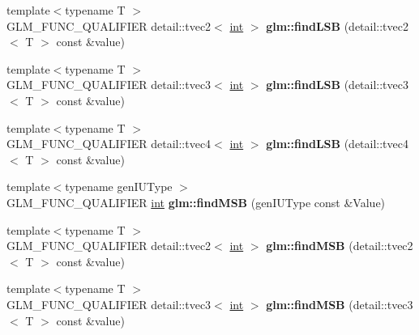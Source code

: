 \begin{DoxyCompactItemize}
\item 
\hypertarget{namespaceglm_ada2390329b6d8939a33c4c0483c1b51c}{}{\footnotesize template$<$typename T $>$ }\\G\+L\+M\+\_\+\+F\+U\+N\+C\+\_\+\+Q\+U\+A\+L\+I\+F\+I\+E\+R detail\+::tvec2$<$ \hyperlink{_s_d_l__thread_8h_a6a64f9be4433e4de6e2f2f548cf3c08e}{int} $>$ {\bfseries glm\+::find\+L\+S\+B} (detail\+::tvec2$<$ T $>$ const \&value)\label{namespaceglm_ada2390329b6d8939a33c4c0483c1b51c}

\item 
\hypertarget{namespaceglm_a9706c7ccb2061db6a078a742fb9ed7d0}{}{\footnotesize template$<$typename T $>$ }\\G\+L\+M\+\_\+\+F\+U\+N\+C\+\_\+\+Q\+U\+A\+L\+I\+F\+I\+E\+R detail\+::tvec3$<$ \hyperlink{_s_d_l__thread_8h_a6a64f9be4433e4de6e2f2f548cf3c08e}{int} $>$ {\bfseries glm\+::find\+L\+S\+B} (detail\+::tvec3$<$ T $>$ const \&value)\label{namespaceglm_a9706c7ccb2061db6a078a742fb9ed7d0}

\item 
\hypertarget{namespaceglm_affbe54a797335fd2dd46f5dbabb03f1e}{}{\footnotesize template$<$typename T $>$ }\\G\+L\+M\+\_\+\+F\+U\+N\+C\+\_\+\+Q\+U\+A\+L\+I\+F\+I\+E\+R detail\+::tvec4$<$ \hyperlink{_s_d_l__thread_8h_a6a64f9be4433e4de6e2f2f548cf3c08e}{int} $>$ {\bfseries glm\+::find\+L\+S\+B} (detail\+::tvec4$<$ T $>$ const \&value)\label{namespaceglm_affbe54a797335fd2dd46f5dbabb03f1e}

\item 
\hypertarget{namespaceglm_adc22c75c7dd35bacf86237d8bfe8b53a}{}{\footnotesize template$<$typename gen\+I\+U\+Type $>$ }\\G\+L\+M\+\_\+\+F\+U\+N\+C\+\_\+\+Q\+U\+A\+L\+I\+F\+I\+E\+R \hyperlink{_s_d_l__thread_8h_a6a64f9be4433e4de6e2f2f548cf3c08e}{int} {\bfseries glm\+::find\+M\+S\+B} (gen\+I\+U\+Type const \&Value)\label{namespaceglm_adc22c75c7dd35bacf86237d8bfe8b53a}

\item 
\hypertarget{namespaceglm_a242a34bcfa82ccbecb081091cfc5dcd3}{}{\footnotesize template$<$typename T $>$ }\\G\+L\+M\+\_\+\+F\+U\+N\+C\+\_\+\+Q\+U\+A\+L\+I\+F\+I\+E\+R detail\+::tvec2$<$ \hyperlink{_s_d_l__thread_8h_a6a64f9be4433e4de6e2f2f548cf3c08e}{int} $>$ {\bfseries glm\+::find\+M\+S\+B} (detail\+::tvec2$<$ T $>$ const \&value)\label{namespaceglm_a242a34bcfa82ccbecb081091cfc5dcd3}

\item 
\hypertarget{namespaceglm_a20b9f76c43fa5f5e8f2f735bf0ac05be}{}{\footnotesize template$<$typename T $>$ }\\G\+L\+M\+\_\+\+F\+U\+N\+C\+\_\+\+Q\+U\+A\+L\+I\+F\+I\+E\+R detail\+::tvec3$<$ \hyperlink{_s_d_l__thread_8h_a6a64f9be4433e4de6e2f2f548cf3c08e}{int} $>$ {\bfseries glm\+::find\+M\+S\+B} (detail\+::tvec3$<$ T $>$ const \&value)\label{namespaceglm_a20b9f76c43fa5f5e8f2f735bf0ac05be}


\end{DoxyCompactItemize}
